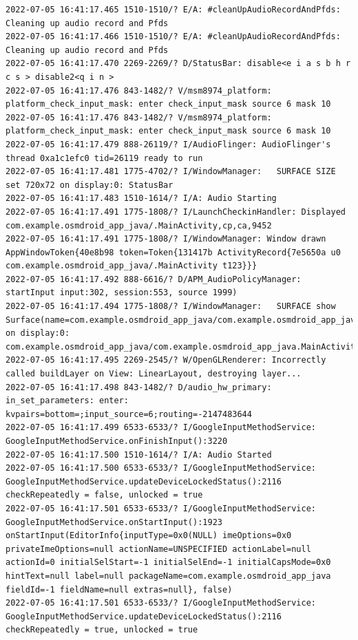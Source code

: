\documentclass[a4paper,12pt]{book}
\begin{document}
\begin{lstlisting}
2022-07-05 16:41:17.465 1510-1510/? E/A: #cleanUpAudioRecordAndPfds: Cleaning up audio record and Pfds
2022-07-05 16:41:17.466 1510-1510/? E/A: #cleanUpAudioRecordAndPfds: Cleaning up audio record and Pfds
2022-07-05 16:41:17.470 2269-2269/? D/StatusBar: disable<e i a s b h r c s > disable2<q i n >
2022-07-05 16:41:17.476 843-1482/? V/msm8974_platform: platform_check_input_mask: enter check_input_mask source 6 mask 10
2022-07-05 16:41:17.476 843-1482/? V/msm8974_platform: platform_check_input_mask: enter check_input_mask source 6 mask 10
2022-07-05 16:41:17.479 888-26119/? I/AudioFlinger: AudioFlinger's thread 0xa1c1efc0 tid=26119 ready to run
2022-07-05 16:41:17.481 1775-4702/? I/WindowManager:   SURFACE SIZE set 720x72 on display:0: StatusBar
2022-07-05 16:41:17.483 1510-1614/? I/A: Audio Starting
2022-07-05 16:41:17.491 1775-1808/? I/LaunchCheckinHandler: Displayed com.example.osmdroid_app_java/.MainActivity,cp,ca,9452
2022-07-05 16:41:17.491 1775-1808/? I/WindowManager: Window drawn AppWindowToken{40e8b98 token=Token{131417b ActivityRecord{7e5650a u0 com.example.osmdroid_app_java/.MainActivity t123}}}
2022-07-05 16:41:17.492 888-6616/? D/APM_AudioPolicyManager: startInput input:302, session:553, source 1999)
2022-07-05 16:41:17.494 1775-1808/? I/WindowManager:   SURFACE show Surface(name=com.example.osmdroid_app_java/com.example.osmdroid_app_java.MainActivity)/@0x5666d56 on display:0: com.example.osmdroid_app_java/com.example.osmdroid_app_java.MainActivity
2022-07-05 16:41:17.495 2269-2545/? W/OpenGLRenderer: Incorrectly called buildLayer on View: LinearLayout, destroying layer...
2022-07-05 16:41:17.498 843-1482/? D/audio_hw_primary: in_set_parameters: enter: kvpairs=bottom=;input_source=6;routing=-2147483644
2022-07-05 16:41:17.499 6533-6533/? I/GoogleInputMethodService: GoogleInputMethodService.onFinishInput():3220 
2022-07-05 16:41:17.500 1510-1614/? I/A: Audio Started
2022-07-05 16:41:17.500 6533-6533/? I/GoogleInputMethodService: GoogleInputMethodService.updateDeviceLockedStatus():2116 checkRepeatedly = false, unlocked = true
2022-07-05 16:41:17.501 6533-6533/? I/GoogleInputMethodService: GoogleInputMethodService.onStartInput():1923 onStartInput(EditorInfo{inputType=0x0(NULL) imeOptions=0x0 privateImeOptions=null actionName=UNSPECIFIED actionLabel=null actionId=0 initialSelStart=-1 initialSelEnd=-1 initialCapsMode=0x0 hintText=null label=null packageName=com.example.osmdroid_app_java fieldId=-1 fieldName=null extras=null}, false)
2022-07-05 16:41:17.501 6533-6533/? I/GoogleInputMethodService: GoogleInputMethodService.updateDeviceLockedStatus():2116 checkRepeatedly = true, unlocked = true

\end{lstlisting}
\end{document}
